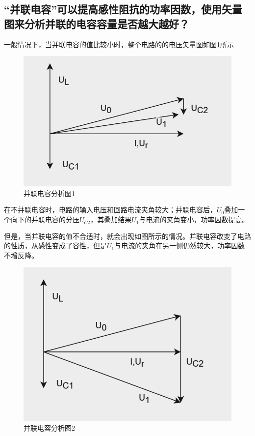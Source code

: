\documentclass{ctexart}
\begin{document}
\subsection{“并联电容”可以提高感性阻抗的功率因数，使用矢量图来分析并联的电容容量是否越大越好？}
一般情况下，当并联电容的值比较小时，整个电路的的电压矢量图如图\ref{fig:并联电容分析图1}所示
\begin{figure}[!ht]
    \centering
    \includegraphics{pic/并联电容分析图1.png}
    \caption{并联电容分析图1}
    \label{fig:并联电容分析图1}
\end{figure}
在不并联电容时，电路的输入电压和回路电流夹角较大；并联电容后，$U_0$叠加一个向下的并联电容的分压$U_{C2}$，其叠加结果$U_1$与电流的夹角变小，功率因数提高。

但是，当并联电容的值不合适时，就会出现如图所示的情况。并联电容改变了电路的性质，从感性变成了容性，但是$U_1$与电流的夹角在另一侧仍然较大，功率因数不增反降。
\begin{figure}[!ht]
    \centering
    \includegraphics{pic/并联电容分析图2.png}
    \caption{并联电容分析图2}
    \label{fig:并联电容分析图2}
\end{figure}
\end{document}
